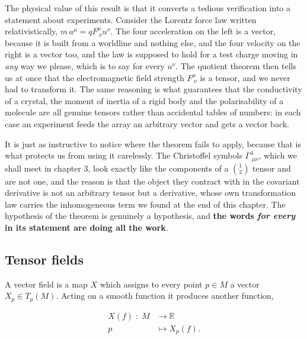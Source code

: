         The physical value of this result is that it converts a tedious verification into a statement about experiments. Consider the Lorentz force law written relativistically, $m\,a^{\mu} = qF^{\mu}_{\;\nu}u^{\nu}$. The four acceleration on the left is a vector, because it is built from a worldline and nothing else, and the four velocity on the right is a vector too, and the law is supposed to hold for a test charge moving in \textit{any} way we please, which is to say for every $u^{\nu}$. The quotient theorem then tells us at once that the electromagnetic field strength $F^{\mu}_{\;\nu}$ is a tensor, and we never had to transform it. The same reasoning is what guarantees that the conductivity of a crystal, the moment of inertia of a rigid body and the polarisability of a molecule are all genuine tensors rather than accidental tables of numbers: in each case an experiment feeds the array an arbitrary vector and gets a vector back.

        It is just as instructive to notice where the theorem fails to apply, because that is what protects us from using it carelessly. The Christoffel symbols $\Gamma^{\lambda}_{\;\mu\nu}$, which we shall meet in chapter 3, look exactly like the components of a $\binom{1}{2}$ tensor and are not one, and the reason is that the object they contract with in the covariant derivative is not an arbitrary tensor but a derivative, whose own transformation law carries the inhomogeneous term we found at the end of this chapter. The hypothesis of the theorem is genuinely a hypothesis, and \textbf{the words \textit{for every} in its statement are doing all the work}.

    \subsection{Tensor fields}

        \begin{myDef}
            A vector field is a map $X$ which assigns to every point $p \in M$ a vector $X_p \in T_p(M)$. Acting on a smooth function it produces another function,

            \begin{equation}
                \begin{split}
                    X(f)\;:\;M &\longrightarrow \mathbb{R}\\
                    p &\longmapsto X_p(f).
                \end{split}
            \end{equation}
        \end{myDef}


